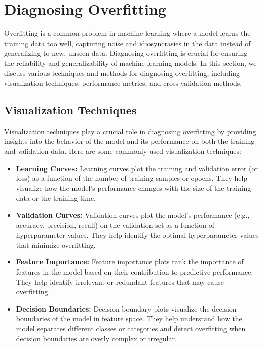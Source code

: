 \documentclass[12pt]{book} %
\begin{document}
\section{Diagnosing Overfitting}

Overfitting is a common problem in machine learning where a model learns the training data too well, capturing noise and idiosyncrasies in the data instead of generalizing to new, unseen data. Diagnosing overfitting is crucial for ensuring the reliability and generalizability of machine learning models. In this section, we discuss various techniques and methods for diagnosing overfitting, including visualization techniques, performance metrics, and cross-validation methods.

\subsection{Visualization Techniques}

Visualization techniques play a crucial role in diagnosing overfitting by providing insights into the behavior of the model and its performance on both the training and validation data. Here are some commonly used visualization techniques:

\begin{itemize}
    \item \textbf{Learning Curves:} Learning curves plot the training and validation error (or loss) as a function of the number of training samples or epochs. They help visualize how the model's performance changes with the size of the training data or the training time.
    
    \item \textbf{Validation Curves:} Validation curves plot the model's performance (e.g., accuracy, precision, recall) on the validation set as a function of hyperparameter values. They help identify the optimal hyperparameter values that minimize overfitting.
    
    \item \textbf{Feature Importance:} Feature importance plots rank the importance of features in the model based on their contribution to predictive performance. They help identify irrelevant or redundant features that may cause overfitting.
    
    \item \textbf{Decision Boundaries:} Decision boundary plots visualize the decision boundaries of the model in feature space. They help understand how the model separates different classes or categories and detect overfitting when decision boundaries are overly complex or irregular.
\end{itemize}
\end{document}
